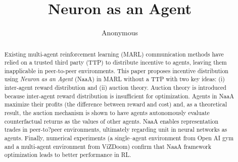 \documentclass{article} %
\title{Neuron as an Agent}
\author{Anonymous}
\begin{document}
\maketitle

\begin{abstract}
Existing multi-agent reinforcement learning (MARL) communication methods have relied on a trusted third party (TTP) to distribute incentive to agents, leaving them inapplicable in peer-to-peer environments.
This paper proposes incentive distribution using {\em Neuron as an Agent} (NaaA) in MARL without a TTP with two key ideas:
(i) inter-agent reward distribution and (ii) auction theory.
Auction theory is introduced because inter-agent reward distribution is insufficient for optimization.
Agents in NaaA maximize their profits (the difference between reward and cost) and, as a theoretical result, the auction mechanism is shown to have agents autonomously evaluate counterfactual returns as the values of other agents.
NaaA enables representation trades in peer-to?peer environments, ultimately regarding unit in neural networks as agents.
Finally, numerical experiments (a single--agent environment from Open AI gym and a multi-agent environment from ViZDoom) confirm that NaaA framework optimization leads to better performance in RL.
\end{abstract}













\end{document}
